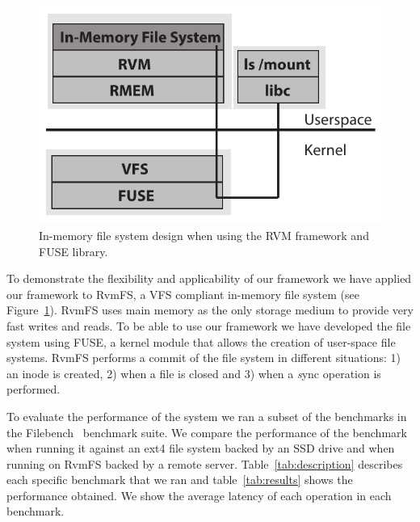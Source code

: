 
\begin{figure}[t!]
\begin{center}
\includegraphics[scale=0.60]{graphs/inmem_fs_design.pdf}
\end{center}
\caption{In-memory file system design when using the RVM framework and FUSE library.}
\label{fig:inmem_fs_design}
\end{figure}

To demonstrate the flexibility and applicability of our framework we have applied our framework to RvmFS, a VFS compliant in-memory file system (see Figure~\ref{fig:inmem_fs_design}). 
RvmFS uses main memory as the only storage medium to provide very fast writes and reads. 
To be able to use our framework we have developed the file system using FUSE, a kernel module that allows the creation of user-space file systems.
RvmFS performs a commit of the file system in different situations: 1) an inode is created, 2) when a file is closed and 3) when a {\emph sync} operation is performed.

To evaluate the performance of the system we ran a subset of the benchmarks in the Filebench~\cite{filebench} benchmark suite. 
We compare the performance of the benchmark when running it against an ext4 file system backed by an SSD drive and when running on RvmFS backed by a remote server.
Table~\ref{tab:description} describes each specific benchmark that we ran and table~\ref{tab:results} shows the performance obtained.
We show the average latency of each operation in each benchmark.

